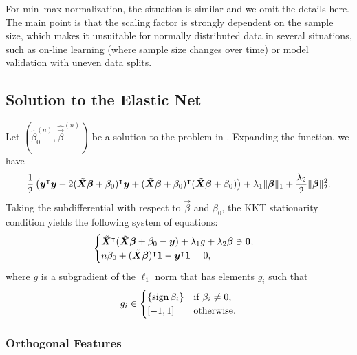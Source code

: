 For min--max normalization, the situation is similar and we omit the details here. The main
point is that the scaling factor is strongly dependent on the sample size, which makes it
unsuitable for normally distributed data in several situations, such as on-line learning
(where sample size changes over time) or model validation with uneven data splits.

\subsection{Solution to the Elastic Net}%
\label{sec:elastic-net-estimator}

Let \((\hat{\beta}_0^{(n)}, \hat{\vec{\beta}}^{(n)})\) be a solution to the problem in
. Expanding the function, we have
\[
  \frac{1}{2}\left( \bm y^\intercal \bm y - 2(\tilde{\bm{X}}\bm{\beta} + \beta_0)^\intercal\bm{y} + (\tilde{\bm{X}}\bm{\beta} + \beta_0)^\intercal(\tilde{\bm{X}}\bm{\beta} + \beta_0)\right)
  + \lambda_1 \lVert \bm\beta \rVert_1 + \frac{\lambda_2}{2}\lVert \bm \beta \rVert_2^2.
\]
Taking the subdifferential with respect to \(\vec{\beta}\) and \(\beta_0\), the KKT
stationarity condition yields the following system of equations:
\begin{equation}
  \label{eq:kkt-elasticnet}
  \begin{cases}
    \tilde{\bm{X}}^\intercal(\tilde{\bm{X}}\bm{\beta} + \beta_0 - \bm{y}) + \lambda_1 g + \lambda_2 \bm\beta \ni \bm{0}, \\
    n \beta_0 + (\tilde{\bm{X}}\bm{\beta})^\intercal \bm{1} - \bm{y}^\intercal \bm{1} = 0,
  \end{cases}
\end{equation}
where \(g\) is a subgradient of the \(\ell_1\) norm that has elements \(g_i\) such that
\[
  g_i \in
  \begin{cases}
    \{\operatorname{sign}{\beta_i}\} & \text{if } \beta_i \neq 0, \\
    [-1, 1]            & \text{otherwise}.
  \end{cases}
\]

\subsubsection{Orthogonal Features}

